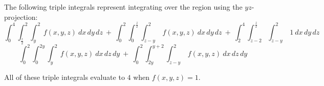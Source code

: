 \documentclass{amsart}
\theoremstyle{definition}
\begin{document}
\vspace{0.5cm}
The following triple integrals represent integrating over the region using the $yz$-projection:
\vspace{0.5cm}
\[\int_0^4\int_{\frac{z}{2}}^{2}\int_{y}^{2} \ f(x,y,z) \ dx \, dy \, dz \ + \ \int_0^2\int_0^{\frac{z}{2}}\int_{z-y}^{2} \ f(x,y,z) \ dx \, dy \, dz \ + \ \int_2^4\int_{z-2}^{\frac{z}{2}}\int_{z-y}^{2} \ 1 \ dx \, dy \, dz \]
\vspace{0.5cm}
\[ \int_0^2\int_0^{2y}\int_{y}^{2} \ f(x,y,z) \ dx \, dz \, dy \ + \ \int_0^2\int_{2y}^{y+2}\int_{z-y}^{2} \ f(x,y,z) \ dx \, dz \, dy \]

\vspace{1em}
All of these triple integrals evaluate to $4$ when $f(x,y,z) = 1$.
\end{document}
